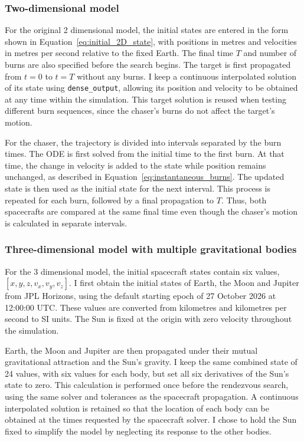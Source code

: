 \documentclass[11pt,letterpaper]{article}
\begin{document}
\subsubsection{Two-dimensional model}
For the original 2 dimensional model, the initial states are entered in
the form shown in Equation~\ref{eq:initial_2D_state}, with positions in
metres and velocities in metres per second relative to the fixed Earth.
The final time $T$ and number of burns are also specified before the
search begins. The target is first propagated from $t=0$ to $t=T$ without
any burns. I keep a continuous interpolated solution of its state using
\texttt{dense\_output}, allowing its position and velocity to be obtained
at any time within the simulation. This target solution is reused when
testing different burn sequences, since the chaser's burns do not affect
the target's motion.

For the chaser, the trajectory is divided into intervals separated by
the burn times. The ODE is first solved from the initial time to the
first burn. At that time, the change in velocity is added to the state
while position remains unchanged, as described in
Equation~\ref{eq:instantaneous_burns}. The updated state is then used as
the initial state for the next interval. This process is repeated for
each burn, followed by a final propagation to $T$. Thus, both spacecrafts
are compared at the same final time even though the chaser's motion is
calculated in separate intervals.

\subsubsection{Three-dimensional model with multiple gravitational bodies}
For the 3 dimensional model, the initial spacecraft states contain six
values, $[x,y,z,v_x,v_y,v_z]$. I first obtain the initial states of Earth,
the Moon and Jupiter from JPL Horizons, using the default starting epoch
of 27 October 2026 at 12:00:00 UTC. These values are converted
from kilometres and kilometres per second to SI
units. The Sun is fixed at the origin with zero velocity throughout
the simulation.

Earth, the Moon and Jupiter are then propagated under their mutual
gravitational attraction and the Sun's gravity. I keep the same combined
state of 24 values, with six values for each body, but set all six
derivatives of the Sun's state to zero. This calculation is performed once before
the rendezvous search, using the same solver and tolerances as the
spacecraft propagation. A continuous interpolated solution is retained
so that the location of each body can be obtained at the times requested
by the spacecraft solver. I chose to hold the Sun fixed to simplify the model by
neglecting its response to the other bodies.
\end{document}
